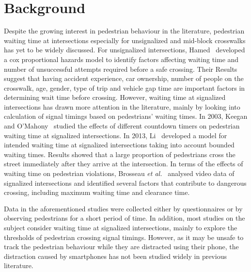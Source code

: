\section{Background}
\label{S:Dback}
Despite the growing interest in pedestrian behaviour in the literature, pedestrian waiting time at intersections especially for unsignalized and mid-block crosswalks has yet to be widely discussed. For unsignalized intersections, Hamed~\cite{hamed2001analysis} developed a cox proportional hazards model to identify factors affecting waiting time and number of unsuccessful attempts required before a safe crossing. Their Results suggest that having accident experience, car ownership, number of people on the crosswalk, age, gender, type of trip and vehicle gap time are important factors in determining wait time before crossing. However, waiting time at signalized intersections has drawn more attention in the literature, mainly by looking into calculation of signal timings based on pedestrians’ waiting times. In 2003, Keegan and O’Mahony~\cite{keegan2003modifying} studied the effects of different countdown timers on pedestrian waiting time at signalized intersections. In 2013, Li~\cite{li2013model} developed a model for intended waiting time at signalized intersections taking into account bounded waiting times. Results showed that a large proportion of pedestrians cross the street immediately after they arrive at the intersection. In terms of the effects of waiting time on pedestrian violations, Brosseau \textit{et al.}~\cite{brosseau2013impact} analysed video data of signalized intersections and identified several factors that contribute to dangerous crossing, including maximum waiting time and clearance time.  

 Data in the aforementioned studies were collected either by questionnaires or by observing pedestrians for a short period of time. In addition, most studies on the subject consider waiting time at signalized intersections, mainly to explore the thresholds of pedestrian crossing signal timings. However, as it may be unsafe to track the pedestrian behaviour while they are distracted using their phone, the distraction caused by smartphones has not been studied widely in previous literature. 
 
